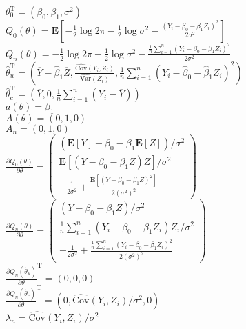 \documentclass[12pt,english]{article}
\newcommand{\T}{\ensuremath{\text{T}}}
\begin{document}
\begin{enumerate}
\begin{enumerate}
		$\theta_{0}^{\T} = (\beta_{0}, \beta_{1}, \sigma^{2})$ \\
		$Q_{0}(\theta) = \mathbf{E}\left[-\frac{1}{2} \log 2\pi - \frac{1}{2} \log \sigma^{2} - \frac{(Y_{i} - \beta_{0} - \beta_{1} Z_{i})^{2}}{2 \sigma^{2}} \right]$ \\
		$Q_{n}(\theta) = -\frac{1}{2} \log 2\pi - \frac{1}{2} \log \sigma^{2} - \frac{\frac{1}{n} \sum_{i=1}^{n} (Y_{i} - \beta_{0} - \beta_{1} Z_{i})^{2}}{2 \sigma^{2}}$ \\
		$\hat{\theta}_{u}^{\T} = (\overline{Y} - \hat{\beta}_{1} \overline{Z}, \frac{\hat{\text{Cov}}(Y_{i}, Z_{i})}{\hat{\text{Var}}(Z_{i})}, \frac{1}{n} \sum_{i=1}^{n} (Y_{i} - \hat{\beta}_{0} - \hat{\beta}_{1} Z_{i})^{2})$ \\
		$\hat{\theta}_{c}^{\T} = (\overline{Y}, 0, \frac{1}{n} \sum_{i=1}^{n} (Y_{i} - \overline{Y}))$ \\
		$a(\theta) = \beta_{1}$ \\
		$A(\theta) = (0, 1, 0)$ \\
		$A_{n} = (0, 1, 0)$ \\
		$\frac{\partial Q_{0}(\theta)}{\partial \theta} = \left( \begin{array}{c} (\mathbf{E}[Y] - \beta_{0} - \beta_{1} \mathbf{E}[Z]) / \sigma^{2} \\ \mathbf{E}[(Y - \beta_{0} - \beta_{1} Z)Z]/\sigma^{2} \\ -\frac{1}{2\sigma^{2}} + \frac{\mathbf{E}[(Y - \beta_{0} - \beta_{1} Z)^{2}]}{2(\sigma^{2})^{2}} \end{array} \right)$ \\
		$\frac{\partial Q_{n}(\theta)}{\partial \theta} = \left( \begin{array}{c} (\overline{Y} - \beta_{0} - \beta_{1} \overline{Z}) / \sigma^{2} \\ \frac{1}{n} \sum_{i=1}^{n} (Y_{i} - \beta_{0} - \beta_{1} Z_{i})Z_{i}/\sigma^{2} \\ -\frac{1}{2\sigma^{2}} + \frac{\frac{1}{n} \sum_{i=1}^{n} (Y_{i} - \beta_{0} - \beta_{1} Z_{i})^{2}}{2(\sigma^{2})^{2}} \end{array} \right)$ \\
		$\frac{\partial Q_{n}(\hat{\theta}_{u})}{\partial \theta}^{\T} = (0,0,0)$ \\
		$\frac{\partial Q_{n}(\hat{\theta}_{c})}{\partial \theta}^{\T} = (0,\hat{\text{Cov}}(Y_{i}, Z_{i}) / \sigma^{2},0)$ \\
		$\lambda_{n} = \hat{\text{Cov}}(Y_{i}, Z_{i}) / \sigma^{2}$ \\

\end{enumerate}
\end{enumerate}
\end{document}
